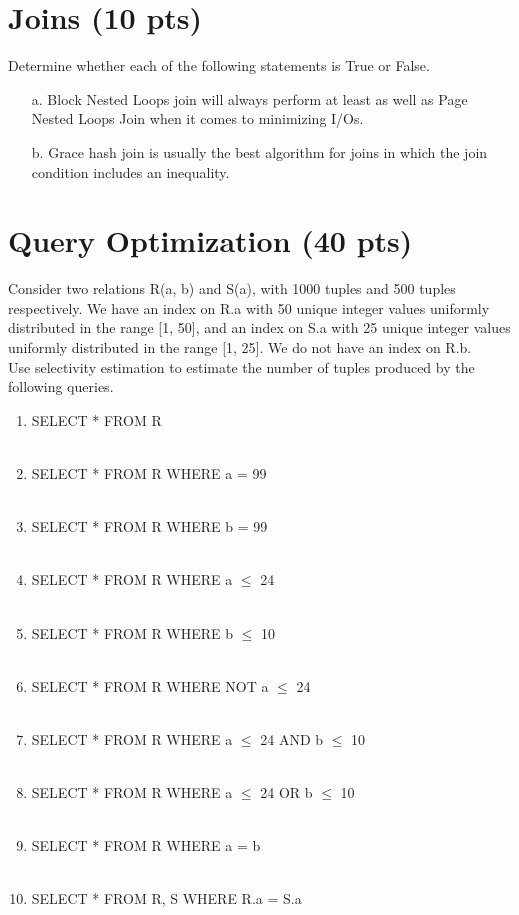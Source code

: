 \documentclass{article}
\begin{document}
\section{Joins (10 pts)}
Determine whether each of the following statements is True or False.
\begin{itemize}
    \item [a.] Block Nested Loops join will always perform at least as well as Page Nested Loops Join when it comes to minimizing I/Os.
    \item [b.] Grace hash join is usually the best algorithm for joins in which the join condition includes an inequality.
\end{itemize}

\section{Query Optimization (40 pts)}
Consider two relations R(a, b) and S(a), with 1000 tuples and 500 tuples respectively. We have
an index on R.a with 50 unique integer values uniformly distributed in the range [1, 50], and an index on
S.a with 25 unique integer values uniformly distributed in the range [1, 25]. We do not have an
index on R.b.\\
Use selectivity estimation to estimate the number of tuples produced by the following queries.
\begin{enumerate}
    \item SELECT * FROM R \\ \\
    \item SELECT * FROM R WHERE a = 99 \\ \\
    \item SELECT * FROM R WHERE b = 99 \\ \\
    \item SELECT * FROM R WHERE a $\leq$ 24 \\ \\
    \item SELECT * FROM R WHERE b $\leq$ 10 \\ \\
    \item SELECT * FROM R WHERE NOT a $\leq$ 24 \\ \\
    \item SELECT * FROM R WHERE a $\leq$ 24 AND b $\leq$ 10 \\ \\
    \item SELECT * FROM R WHERE a $\leq$ 24 OR b $\leq$ 10 \\ \\
    \item SELECT * FROM R WHERE a = b \\ \\
    \item SELECT * FROM R, S WHERE R.a = S.a \\ \\
\end{enumerate}
\end{document}
